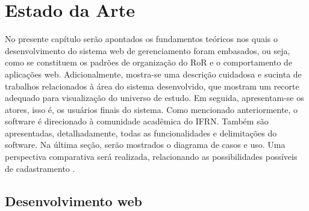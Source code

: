 \chapter{Estado da Arte}\label{cap:estArte}


No presente capítulo serão apontados os fundamentos teóricos nos quais o desenvolvimento do sistema web de gerenciamento foram embasados, ou seja, como se constituem os padrões de organização do RoR e o comportamento de aplicações web. Adicionalmente, mostra-se uma descrição cuidadosa e sucinta de trabalhos relacionados à área do sistema desenvolvido, que mostram um recorte adequado para visualização do universo de estudo. Em seguida, apresentam-se os atores, isso é, os usuários finais do sistema. Como mencionado anteriormente, o software é direcionado à comunidade acadêmica do IFRN. Também são apresentadas, detalhadamente, todas as funcionalidades e delimitações do software. Na última seção, serão mostrados o diagrama de casos e uso. Uma perspectiva comparativa será realizada, relacionando as possibilidades possíveis de cadastramento .  

\section{Desenvolvimento web}%

